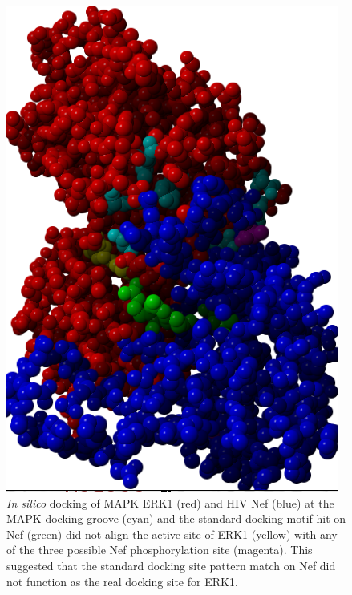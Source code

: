 \begin{figure}
\begin{center}
\includegraphics[scale=0.9]{figs/plos1_new_6}
\end{center}
\caption[Docking between MAPK ERK1 and HIV Nef]{\small \textit{In silico}
  docking of MAPK ERK1 (red) and HIV Nef (blue) at the MAPK docking
  groove (cyan) and the standard docking motif hit on Nef (green) did
  not align the active site of ERK1 (yellow) with any of the three
  possible Nef phosphorylation site (magenta). This suggested that the
  standard docking site pattern match on Nef did not function as the
  real docking site for ERK1. \label{fig:plos1:new}}
\end{figure}

